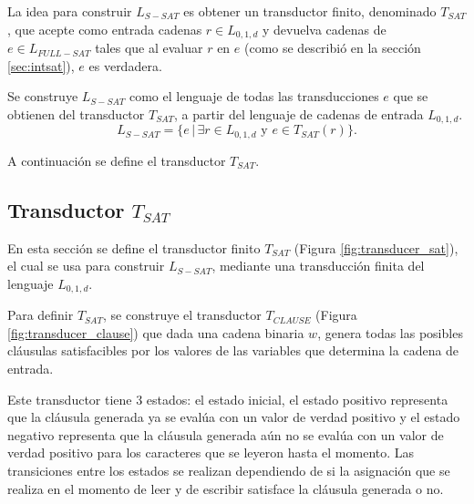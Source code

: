 La idea para construir $L_{S-SAT}$ es obtener un transductor finito, denominado $T_{SAT}$, que acepte como
entrada cadenas $r\in L_{0,1,d}$ y devuelva cadenas de $e\in L_{FULL-SAT}$ tales que al evaluar $r$ en $e$
(como se describió en la sección \ref{sec:intsat}), $e$ es verdadera.

Se construye $L_{S-SAT}$ como el lenguaje de todas las transducciones $e$ que se obtienen del transductor
$T_{SAT}$, a partir del lenguaje de cadenas de entrada $L_{0,1,d}$.
$$L_{S-SAT} = \{e\,|\,\exists r \in L_{0,1,d} \text{ y } e \in T_{SAT}(r) \}.$$

A continuación se define el transductor $T_{SAT}$.

\subsection{Transductor $T_{SAT}$}
\label{sec:tsat}

En esta sección se define el transductor finito $T_{SAT}$ (Figura \ref{fig:transducer_sat}), el cual se usa para construir $L_{S-SAT}$, mediante una transducción finita del lenguaje $L_{0,1,d}$.

Para definir $T_{SAT}$, se construye el transductor $T_{CLAUSE}$ (Figura \ref{fig:transducer_clause}) que
dada una cadena binaria $w$, genera todas las posibles cláusulas satisfacibles por los valores de las
variables que determina la cadena de entrada. 

Este transductor tiene 3 estados: el estado inicial, el estado positivo representa que la cláusula generada 
ya se evalúa con un valor de verdad positivo y el estado negativo representa que la cláusula generada aún no 
se evalúa con un valor de verdad positivo para los caracteres que se leyeron hasta el momento. Las transiciones 
entre los estados se realizan dependiendo de si la asignación que se realiza en el momento de leer y de escribir 
satisface la cláusula generada o no.

